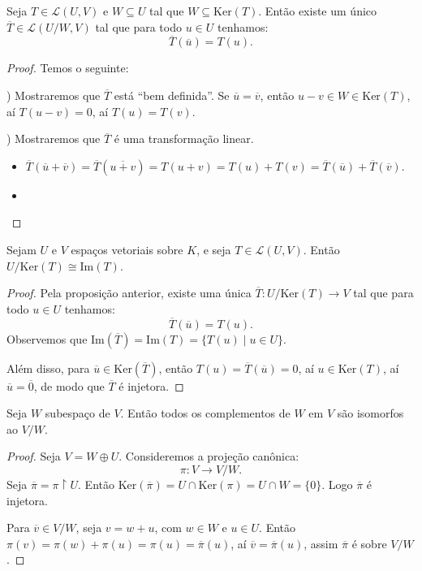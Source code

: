 \documentclass[11pt,twoside,a4paper]{book}
\begin{document}
\begin{proposicao}
Seja $T\in\mathcal{L}(U,V)$ e $W\subseteq U$ tal que $W\subseteq\mathrm{Ker}(T)$. Então existe um único $\overline{T}\in\mathcal{L}(U/W,V)$ tal que para todo $u\in U$ tenhamos:
\[
\overline{T}(\overline{u})=T(u).
\]
\end{proposicao}
\begin{proof}
Temos o seguinte:

\medskip
{}) Mostraremos que $\overline{T}$ está ``bem definida''. Se $\overline{u}=\overline{v}$, então $u-v\in W\in\mathrm{Ker}(T)$, aí $T(u-v)=0$, aí $T(u)=T(v)$.

\medskip
{}) Mostraremos que $\overline{T}$ é uma transformação linear.

\begin{itemize}
\item $\overline{T}(\overline{u}+\overline{v})=\overline{T}(\overline{u+v})=T(u+v)=T(u)+T(v)=\overline{T}(\overline{u})+\overline{T}(\overline{v})$.
\item 
\end{itemize}
\end{proof}

\begin{teorema}
Sejam $U$ e $V$ espaços vetoriais sobre $K$, e seja $T\in\mathcal{L}(U,V)$. Então $U/\mathrm{Ker}(T)\cong\mathrm{Im}(T)$.
\end{teorema}
\begin{proof}
Pela proposição anterior, existe uma única $\overline{T}:U/\mathrm{Ker}(T)\rightarrow V$ tal que para todo $u\in U$ tenhamos:
\[
\overline{T}(\overline{u})=T(u).
\]
Observemos que $\mathrm{Im}(\overline{T})=\mathrm{Im}(T)=\{T(u)\mid u\in U\}$.

\medskip
\noindent
Além disso, para $\overline{u}\in\mathrm{Ker}(\overline{T})$, então $T(u)=\overline{T}(\overline{u})=0$, aí $u\in\mathrm{Ker}(T)$, aí $\overline{u}=\overline{0}$, de modo que $\overline{T}$ é injetora.
\end{proof}

\begin{teorema}
Seja $W$ subespaço de $V$. Então todos os complementos de $W$ em $V$ são isomorfos ao $V/W$.
\end{teorema}
\begin{proof}
Seja $V=W\oplus U$. Consideremos a projeção canônica:
\[
\pi:V\rightarrow V/W.
\]
Seja $\overline{\pi}=\pi\upharpoonright U$. Então $\mathrm{Ker}(\overline{\pi})=U\cap\mathrm{Ker}(\pi)=U\cap W=\{0\}$. Logo $\overline{\pi}$ é injetora.

\medskip
\noindent
Para $\overline{v}\in V/W$, seja $v=w+u$, com $w\in W$ e $u\in U$. Então $\pi(v)=\pi(w)+\pi(u)=\pi(u)=\overline{\pi}(u)$, aí $\overline{v}=\overline{\pi}(u)$, assim $\overline{\pi}$ é sobre $V/W$.
\end{proof}
\end{document}
